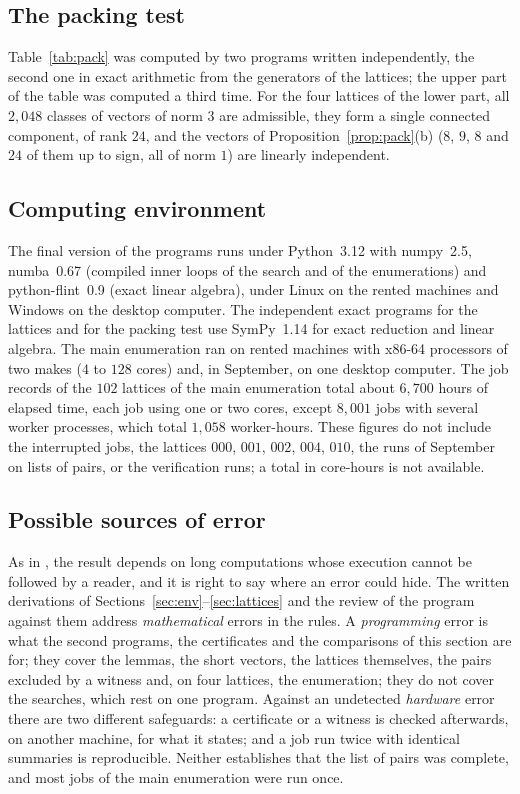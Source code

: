 \documentclass[11pt]{amsart}
\theoremstyle{definition}
\theoremstyle{remark}
\begin{document}
\subsection*{The packing test} Table~\ref{tab:pack} was computed by two programs written independently, the second one in
exact arithmetic from the generators of the lattices; the upper part of the table was computed a third time. For the four
lattices of the lower part, all $2{,}048$ classes of vectors of norm $3$ are admissible, they form a single connected
component, of rank $24$, and the vectors of Proposition~\ref{prop:pack}(b) ($8$, $9$, $8$ and $24$ of them up to sign, all
of norm $1$) are linearly independent.

\subsection*{Computing environment} The final version of the programs runs under Python~3.12 with numpy~2.5, numba~0.67
(compiled inner loops of the search and of the enumerations) and python-flint~0.9 (exact linear algebra), under
Linux on the rented machines and Windows on the desktop computer. The independent exact programs for the lattices and for
the packing test use SymPy~1.14 for exact reduction and linear algebra. The main
enumeration ran on rented machines with x86-64 processors of two makes ($4$ to $128$ cores) and, in September, on one
desktop computer. The job records of the $102$ lattices of the main enumeration total about $6{,}700$ hours of elapsed
time, each job using one or two cores, except $8{,}001$ jobs with several worker processes, which total $1{,}058$
worker-hours. These figures do not include the interrupted jobs, the lattices $000$, $001$, $002$, $004$, $010$, the runs
of September on lists of pairs, or the verification runs; a total in core-hours is not available.

\subsection*{Possible sources of error} As in \cite{LTS}, the result depends on long computations whose execution cannot
be followed by a reader, and it is right to say where an error could hide. The written derivations of Sections~\ref{sec:env}--\ref{sec:lattices} and the review of the program against them
address \emph{mathematical} errors in the rules. A \emph{programming} error is what the second programs, the certificates and the comparisons of this section are
for; they cover the lemmas, the short vectors, the lattices themselves, the pairs excluded by a witness and, on four
lattices, the enumeration; they do not cover the searches, which rest on one program. Against an undetected \emph{hardware} error there are two different safeguards: a certificate or a witness is checked
afterwards, on another machine, for what it states; and a job run twice with identical summaries is reproducible. Neither
establishes that the list of pairs was complete, and most jobs of the main enumeration were run once.
\end{document}
